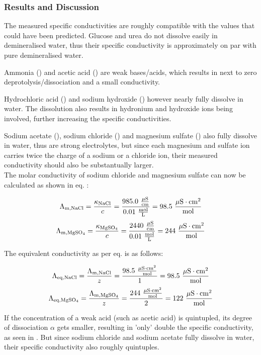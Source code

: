 \documentclass[
	a4paper,										%
	12pt,											%
	twoside,										%
	headsepline,								%
	footsepline,									%
	captions=tableheading,					%
]{scrartcl}
\newcommand{\formel}[2]{				%
	\begin{equation}
		\label{eq: #1}							%
		#2											%
	\end{equation}}
\begin{document}
\subsubsection{Results and Discussion} 

The measured specific conductivities are roughly compatible with the values that could have been predicted.
Glucose and urea do not dissolve easily in demineralised water,
thus their specific conductivity is approximately on par with pure demineralised water.

Ammonia () and acetic acid () are weak bases/acids, which results in next to zero deprotolysis/dissociation and a small conductivity.

Hydrochloric acid () and sodium hydroxide () however nearly fully dissolve in water.
The dissolution also results in hydronium and hydroxide ions being involved, further increasing the specific conductivities.

Sodium acetate (), sodium chloride () and magnesium sulfate () also fully dissolve in water,
thus are strong electrolytes, but since each magnesium and sulfate ion carries twice the charge of a sodium or a chloride ion,
their measured conductivity should also be substantually larger.\\
The molar conductivity of sodium chloride and magnesium sulfate can now be calculated as shown in eq. :

\formel{b1}{\Lambda_{\mathrm{m, \ce{NaCl}}} = \frac{\kappa_{\ce{NaCl}}}{c} = \frac{985.0\ \mathrm{\frac{\mu S}{cm}}}{0.01\ \mathrm{\frac{mol}{L}}} = 98.5\ \mathrm{\frac{\mu S \cdot cm^2}{mol}}}
\formel{b2}{\Lambda_{\mathrm{m, \ce{MgSO4}}} = \frac{\kappa_{\ce{MgSO4}}}{c} = \frac{2440\ \mathrm{\frac{\mu S}{cm}}}{0.01\ \mathrm{\frac{mol}{L}}} = 244\ \mathrm{\frac{\mu S \cdot cm^2}{mol}}}

The equivalent conductivity as per eq.  is as follows:

\formel{b3}{\Lambda_{\mathrm{eq, \ce{NaCl}}} = \frac{\Lambda_{\mathrm{m, \ce{NaCl}}}}{z} = \frac{98.5\ \mathrm{\frac{\mu S \cdot cm^2}{mol}}}{1} = 98.5\ \mathrm{\frac{\mu S \cdot cm^2}{mol}}}
\formel{b4}{\Lambda_{\mathrm{eq, \ce{MgSO4}}} = \frac{\Lambda_{\mathrm{m, \ce{MgSO4}}}}{z} = \frac{244\ \mathrm{\frac{\mu S \cdot cm^2}{mol}}}{2} = 122\ \mathrm{\frac{\mu S \cdot cm^2}{mol}}}

If the concentration of a weak acid (such as acetic acid) is quintupled, its degree of dissociation $\alpha$ gets smaller, resulting in 'only' double the specific conductivity,
as seen in .
But since sodium chloride and sodium acetate fully dissolve in water, their specific conductivity also roughly quintuples.
\end{document}
